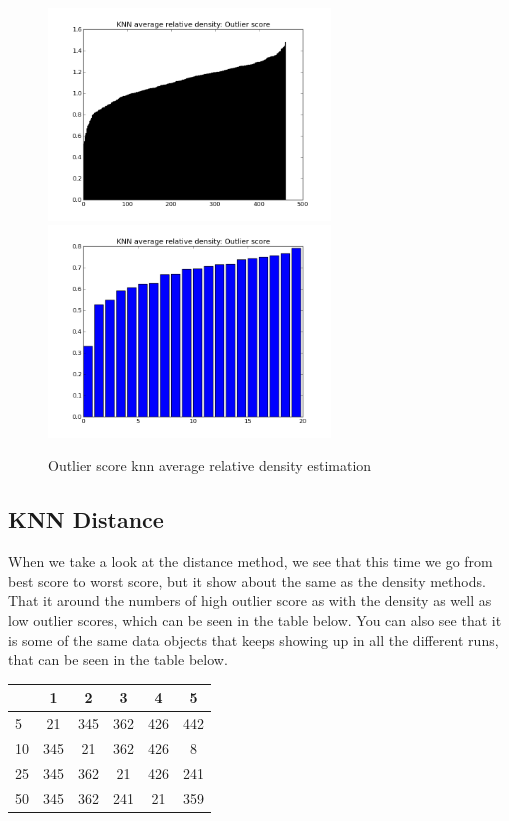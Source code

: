 \begin{figure}[H]
\centering
\includegraphics[width=7.5cm, keepaspectratio=true]{pictures/knnAvgdensityEstimationAll.png}
\includegraphics[width=7.5cm, keepaspectratio=true]{pictures/knnAvgdensityEstimation20.png}
\vspace{-0.4cm}
\caption{\footnotesize Outlier score knn average relative density estimation}
\label{avg}
\end{figure}

\subsection{KNN Distance}

When we take a look at the distance method, we see that this time we go from best score to worst score, but it show about the same as the density methods. That it around the numbers of high outlier score as with the density as well as low outlier scores, which can be seen in the table below. You can also see that it is some of the same data objects that keeps showing up in all the different runs, that can be seen in the table below.

\begin{table}[H]
\begin{longtable}{lccccc}
\hline
   & 1   & 2   & 3   & 4   & 5   \\ \hline
5  & 21  & 345 & 362 & 426 & 442 \\ 
10 & 345 & 21  & 362 & 426 & 8   \\ 
25 & 345 & 362 & 21  & 426 & 241 \\
50 & 345 & 362 & 241 & 21  & 359 \\ \hline
\end{longtable}
\end{table}

